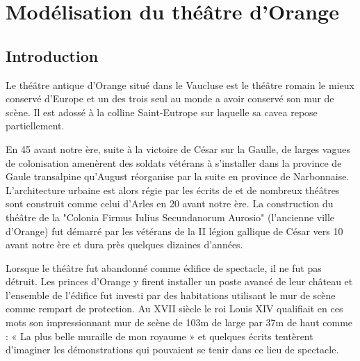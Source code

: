\part{Modélisation du théâtre d’Orange}

	\chapter*{Introduction}
	
			 Le théâtre antique d'Orange situé dans le Vaucluse est le théâtre romain le mieux conservé d'Europe et un des trois seul au monde a avoir conservé son mur de scène. Il est adossé à la colline Saint-Eutrope sur laquelle sa \gls{cavea} repose partiellement.
			 
			 En 45 avant notre ère, suite à la victoire de César sur la Gaulle, de larges vagues de colonisation amenèrent des soldats vétérans à s'installer dans la province de Gaule transalpine qu'August réorganise par la suite en province de Narbonnaise. L'architecture urbaine est alors régie par les écrits de \cite{vitruve} et de nombreux théâtres sont construit comme celui d'Arles en 20 avant notre ère. La construction du théâtre de la "Colonia Firmus Iulius Secundanorum Aurosio" (l'ancienne ville d'Orange) fut démarré par les vétérans de la II légion gallique de César vers 10 avant notre ère et dura près quelques dizaines d'années. \citep{PouvoirDuTheatre}
			 
			 Lorsque le théâtre fut abandonné comme édifice de spectacle, il ne fut pas détruit. Les princes d'Orange y firent installer un poste avancé de leur château et l’ensemble de l’édifice fut investi par des habitations utilisant le mur de scène comme rempart de protection. Au XVII siècle le roi Louis XIV qualifiait en ces mots son impressionnant mur de scène de 103m de large par 37m de haut comme : « La plus belle muraille de mon royaume » et quelques écrits tentèrent d'imaginer les démonstrations qui pouvaient se tenir dans ce lieu de spectacle. 
			 
